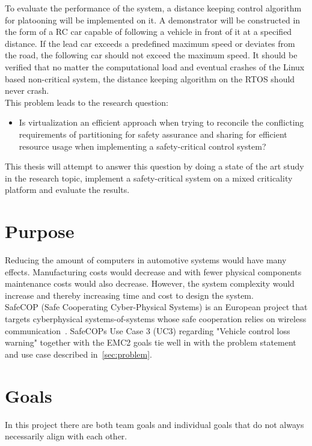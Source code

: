 To evaluate the performance of the system, a distance keeping control algorithm for platooning will be implemented on it. A demonstrator will be constructed in the form of a RC car capable of following a vehicle in front of it at a specified distance. If the lead car exceeds a predefined maximum speed or deviates from the road, the following car should not exceed the maximum speed. It should be verified that no matter the computational load and eventual crashes of the Linux based non-critical system, the distance keeping algorithm on the RTOS should never crash.\\

This problem leads to the research question: 

\begin{itemize}
\item Is virtualization an efficient approach when trying to reconcile the conflicting requirements of partitioning for safety assurance and sharing for efficient resource usage when implementing a safety-critical control system?
\end{itemize}

This thesis will attempt to answer this question by doing a state of the art study in the research topic, implement a safety-critical system on a mixed criticality platform and evaluate the results. 

\section{Purpose}
Reducing the amount of computers in automotive systems would have many effects. Manufacturing costs would decrease and with fewer physical components maintenance costs would also decrease. However, the system complexity would increase and thereby increasing time and cost to design the system. \\

SafeCOP (Safe Cooperating Cyber-Physical Systems) is an European project that targets cyberphysical systems-of-systems whose safe cooperation relies on wireless communication~\cite{safecop2016}. SafeCOPs Use Case 3 (UC3) regarding "Vehicle control loss warning" together with the EMC2 goals tie well in with the problem statement and use case described in~\ref{sec:problem}. 

\section{Goals}
In this project there are both team goals and individual goals that do not always necessarily align with each other.

